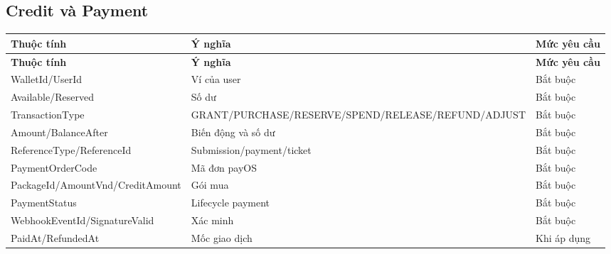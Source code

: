 \documentclass[11pt,a4paper]{article}
\begin{document}
\subsection{Credit và Payment}
\small
\setlength{\tabcolsep}{4pt}
\renewcommand{\arraystretch}{1.18}
\begin{longtable}{|P{0.28\textwidth}|P{0.45\textwidth}|P{0.19\textwidth}|}
\hline
\textbf{Thuộc tính} & \textbf{Ý nghĩa} & \textbf{Mức yêu cầu} \\ \hline
\endfirsthead
\hline
\textbf{Thuộc tính} & \textbf{Ý nghĩa} & \textbf{Mức yêu cầu} \\ \hline
\endhead
WalletId/\allowbreak{}UserId & Ví của user & Bắt buộc \\ \hline
Available/\allowbreak{}Reserved & Số dư & Bắt buộc \\ \hline
TransactionType & GRANT/\allowbreak{}PURCHASE/\allowbreak{}RESERVE/\allowbreak{}SPEND/\allowbreak{}RELEASE/\allowbreak{}REFUND/\allowbreak{}ADJUST & Bắt buộc \\ \hline
Amount/\allowbreak{}BalanceAfter & Biến động và số dư & Bắt buộc \\ \hline
ReferenceType/\allowbreak{}ReferenceId & Submission/\allowbreak{}payment/\allowbreak{}ticket & Bắt buộc \\ \hline
PaymentOrderCode & Mã đơn payOS & Bắt buộc \\ \hline
PackageId/\allowbreak{}AmountVnd/\allowbreak{}CreditAmount & Gói mua & Bắt buộc \\ \hline
PaymentStatus & Lifecycle payment & Bắt buộc \\ \hline
WebhookEventId/\allowbreak{}SignatureValid & Xác minh & Bắt buộc \\ \hline
PaidAt/\allowbreak{}RefundedAt & Mốc giao dịch & Khi áp dụng \\ \hline
\end{longtable}
\normalsize
\end{document}
